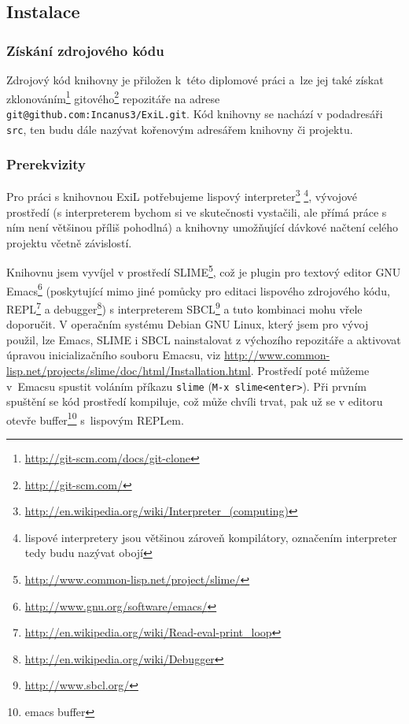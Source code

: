 \subsection{Instalace}
\subsubsection{Získání zdrojového kódu}
Zdrojový kód knihovny je přiložen k~této diplomové práci a~lze jej také získat
zklonováním\footnote{\url{http://git-scm.com/docs/git-clone}}
gitového\footnote{\url{http://git-scm.com/}} repozitáře na adrese
\verb|git@github.com:Incanus3/ExiL.git|.
Kód knihovny se nachází v podadresáři \verb|src|, ten budu dále nazývat kořenovým
adresářem knihovny či projektu.
\subsubsection{Prerekvizity}
Pro práci s knihovnou ExiL potřebujeme lispový
interpreter\footnote{\url{http://en.wikipedia.org/wiki/Interpreter_(computing)}}
\footnote{lispové interpretery jsou většinou zároveň
kompilátory\footnotemark[6], označením
interpreter tedy budu nazývat obojí},
vývojové prostředí (s interpreterem bychom si ve skutečnosti vystačili, ale
přímá práce s ním není většinou příliš pohodlná) a knihovny umožňující
dávkové načtení celého projektu včetně závislostí.

Knihovnu jsem vyvíjel v prostředí
SLIME\footnote{\url{http://www.common-lisp.net/project/slime/}}, což je plugin
pro textový editor GNU Emacs\footnote{\url{http://www.gnu.org/software/emacs/}}
(poskytující mimo jiné pomůcky pro editaci lispového zdrojového kódu,
REPL\footnote{\url{http://en.wikipedia.org/wiki/Read-eval-print_loop}} a
debugger\footnote{\url{http://en.wikipedia.org/wiki/Debugger}})
s interpreterem SBCL\footnote{\url{http://www.sbcl.org/}} a tuto kombinaci
mohu vřele doporučit. V operačním systému Debian GNU Linux, který jsem pro vývoj
použil, lze Emacs, SLIME i SBCL nainstalovat z výchozího repozitáře a aktivovat
úpravou inicializačního souboru Emacsu, viz
\url{http://www.common-lisp.net/projects/slime/doc/html/Installation.html}.
Prostředí poté můžeme v~Emacsu spustit voláním příkazu \verb|slime|
(\verb|M-x slime<enter>|). Při prvním spuštění se kód prostředí kompiluje, což
může chvíli trvat, pak už se v editoru otevře buffer\footnote{emacs buffer}
s~lispovým REPLem.

